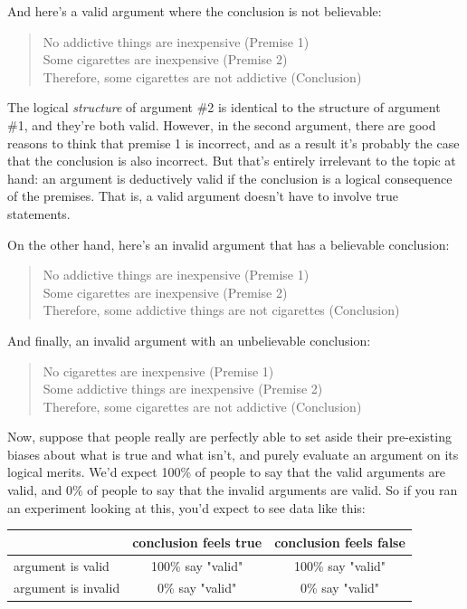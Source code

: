 \documentclass[
]{book}
\theoremstyle{definition}
\theoremstyle{definition}
\theoremstyle{definition}
\theoremstyle{definition}
\theoremstyle{remark}
\begin{document}
And here's a valid argument where the conclusion is not believable:

\begin{quote}
No addictive things are inexpensive (Premise 1)\\
Some cigarettes are inexpensive (Premise 2)\\
Therefore, some cigarettes are not addictive (Conclusion)
\end{quote}

The logical \emph{structure} of argument \#2 is identical to the structure of argument \#1, and they're both valid. However, in the second argument, there are good reasons to think that premise 1 is incorrect, and as a result it's probably the case that the conclusion is also incorrect. But that's entirely irrelevant to the topic at hand: an argument is deductively valid if the conclusion is a logical consequence of the premises. That is, a valid argument doesn't have to involve true statements.

On the other hand, here's an invalid argument that has a believable conclusion:

\begin{quote}
No addictive things are inexpensive (Premise 1)\\
Some cigarettes are inexpensive (Premise 2)\\
Therefore, some addictive things are not cigarettes (Conclusion)
\end{quote}

And finally, an invalid argument with an unbelievable conclusion:

\begin{quote}
No cigarettes are inexpensive (Premise 1)\\
Some addictive things are inexpensive (Premise 2)\\
Therefore, some cigarettes are not addictive (Conclusion)
\end{quote}

Now, suppose that people really are perfectly able to set aside their pre-existing biases about what is true and what isn't, and purely evaluate an argument on its logical merits. We'd expect 100\% of people to say that the valid arguments are valid, and 0\% of people to say that the invalid arguments are valid. So if you ran an experiment looking at this, you'd expect to see data like this:

\begin{table}[H]
\centering
\begin{tabular}{lcc}
\toprule
  & conclusion feels true & conclusion feels false\\
\midrule
argument is valid & 100\% say "valid" & 100\% say "valid"\\
argument is invalid & 0\% say "valid" & 0\% say "valid"\\
\bottomrule
\end{tabular}
\end{table}
\end{document}
